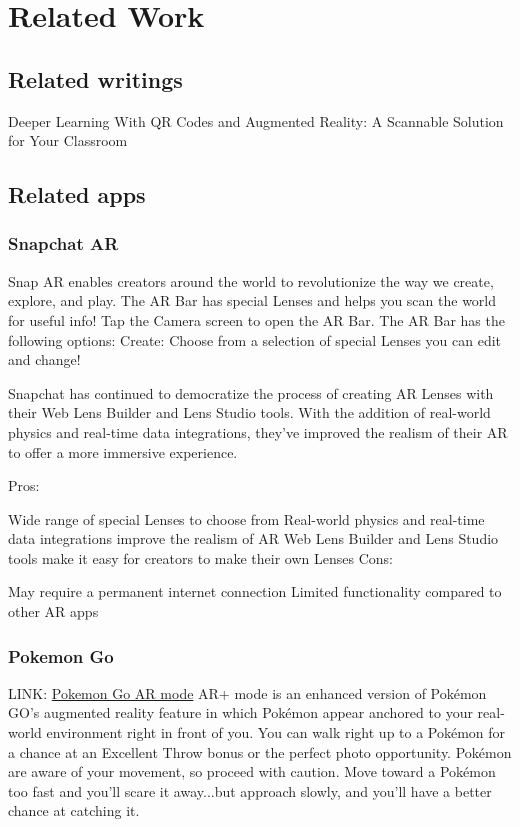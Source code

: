 \chapter{Related Work }\label{cap:relatedwork}
\section{Related writings}
Deeper Learning With QR Codes and Augmented Reality: A Scannable Solution for Your Classroom
\section{Related apps}

\subsection{Snapchat AR}
Snap AR enables creators around the world to revolutionize the way we create, explore, and play. The AR Bar has special Lenses and helps you scan the world for useful info! Tap the Camera screen to open the AR Bar. The AR Bar has the following options: Create: Choose from a selection of special Lenses you can edit and change!

Snapchat has continued to democratize the process of creating AR Lenses with their Web Lens Builder and Lens Studio tools. With the addition of real-world physics and real-time data integrations, they've improved the realism of their AR to offer a more immersive experience.

Pros:

Wide range of special Lenses to choose from
Real-world physics and real-time data integrations improve the realism of AR
Web Lens Builder and Lens Studio tools make it easy for creators to make their own Lenses
Cons:

May require a permanent internet connection
Limited functionality compared to other AR apps
\subsection{Pokemon Go}
LINK: \href{https://niantic.helpshift.com/hc/en/6-pokemon-go/faq/28-catching-pokemon-in-ar-mode/}{Pokemon Go AR mode}
AR+ mode is an enhanced version of Pokémon GO’s augmented reality feature in which Pokémon appear anchored to your real-world environment right in front of you. You can walk right up to a Pokémon for a chance at an Excellent Throw bonus or the perfect photo opportunity. Pokémon are aware of your movement, so proceed with caution. Move toward a Pokémon too fast and you’ll scare it away...but approach slowly, and you’ll have a better chance at catching it.

